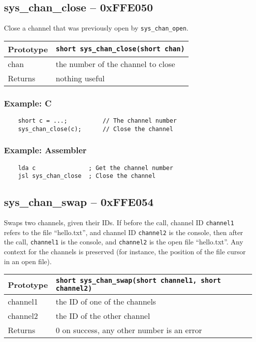 \subsection*{sys\_chan\_close -- 0xFFE050}
Close a channel that was previously open by \lstinline|sys_chan_open|.

\bigskip

\begin{tabular}{|l||l|} \hline
Prototype & \lstinline!short sys_chan_close(short chan)! \\ \hline
chan & the number of the channel to close \\ \hline
Returns & nothing useful \\ \hline
\end{tabular}

\subsubsection*{Example: C}
\begin{lstlisting}
    short c = ...;          // The channel number
    sys_chan_close(c);      // Close the channel
\end{lstlisting}

\subsubsection*{Example: Assembler}
\begin{verbatim}
    lda c               ; Get the channel number
    jsl sys_chan_close  ; Close the channel
\end{verbatim}

\subsection*{sys\_chan\_swap -- 0xFFE054}
Swaps two channels, given their IDs. If before the call, channel ID \verb+channel1+ refers to the file ``hello.txt'', and channel ID \verb+channel2+ is the console, then after the call, \verb+channel1+ is the console, and \verb+channel2+ is the open file ``hello.txt''. Any context for the channels is preserved (for instance, the position of the file cursor in an open file).

\bigskip

\begin{tabular}{|l||l|} \hline
Prototype & \lstinline!short sys_chan_swap(short channel1, short channel2)! \\ \hline
channel1 & the ID of one of the channels \\ \hline
channel2 & the ID of the other channel \\ \hline
Returns & 0 on success, any other number is an error \\ \hline
\end{tabular}

